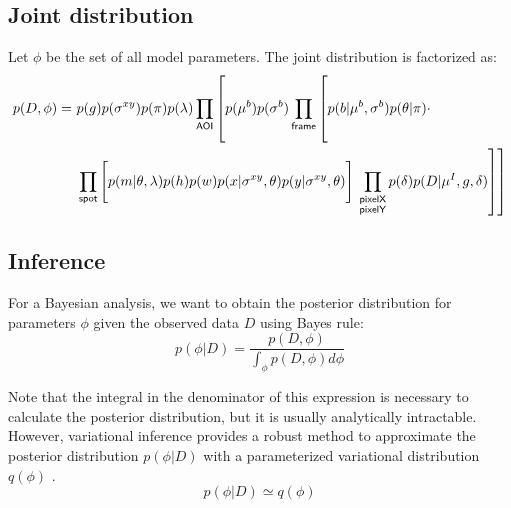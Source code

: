 

\subsection*{Joint distribution}

Let $\phi$ be the set of all model parameters. The joint distribution is factorized as:
%
\begin{equation}
\begin{aligned}
    p(D, \phi) =~&p(g) p(\sigma^{xy}) p(\pi) p(\lambda) \prod_{\mathsf{AOI}} \left[ p(\mu^b) p(\sigma^b) \prod_{\mathsf{frame}} \left[ \vphantom{\prod_{F}} p(b | \mu^b, \sigma^b) p(\theta | \pi) \vphantom{\prod_{\substack{\mathsf{pixelX} \\ \mathsf{pixelY}}}} \cdot \right. \right. \\
    &\prod_{\mathsf{spot}} \left[ \vphantom{\prod_{F}} p(m | \theta, \lambda) p(h) p(w) p(x | \sigma^{xy}, \theta) p(y | \sigma^{xy}, \theta) \right] \left. \left. \prod_{\substack{\mathsf{pixelX} \\ \mathsf{pixelY}}} p(\delta) p(D | \mu^I, g, \delta) \right] \right]
\end{aligned}
\end{equation}

\subsection*{Inference}

For a Bayesian analysis, we want to obtain the posterior distribution for parameters $\phi$ given the observed data $D$ using Bayes rule:
%
\begin{equation}
    p(\phi | D) =
    \dfrac{p(D, \phi)}{\int_{\phi} p(D, \phi) d\phi}
\end{equation}

Note that the integral in the denominator of this expression is necessary to calculate the posterior distribution, but it is usually analytically intractable. However, variational inference provides a robust method to approximate the posterior distribution $p(\phi | D)$ with a parameterized variational distribution $q(\phi)$ \cite{Bishop2006-oa}.
%
\begin{equation}
    p(\phi | D) \simeq q(\phi)
\end{equation}

